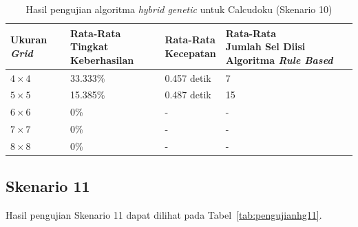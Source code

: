 \begin{table}
\centering
\captionsetup{justification=centering}
\caption[Hasil pengujian algoritma \textit{hybrid genetic} untuk Calcudoku (Skenario 10)]{Hasil pengujian algoritma \textit{hybrid genetic} untuk Calcudoku (Skenario 10)}
\begin{tabular}{| l | l | l | l |}
\hline
Ukuran \textit{Grid} & \makecell[c]{Rata-Rata \\ Tingkat Keberhasilan} & \makecell[c]{Rata-Rata \\ Kecepatan} & \makecell[c]{Rata-Rata \\ Jumlah Sel Diisi Algoritma \textit{Rule Based}} \\
\hline \hline
\begin{math}4 \times 4\end{math} & 33.333\% & 0.457 detik & 7 \\
\hline
\begin{math}5 \times 5\end{math} & 15.385\% & 0.487 detik & 15 \\
\hline
\begin{math}6 \times 6\end{math} & 0\% & - & - \\
\hline
\begin{math}7 \times 7\end{math} & 0\% & - & - \\
\hline
\begin{math}8 \times 8\end{math} & 0\% & - & - \\
\hline
\end{tabular}
\label{tab:pengujianhg10}
\end{table}

\clearpage

\subsection{Skenario 11}
\label{sec:skenario11}

Hasil pengujian Skenario 11 dapat dilihat pada Tabel~\ref{tab:pengujianhg11}.

